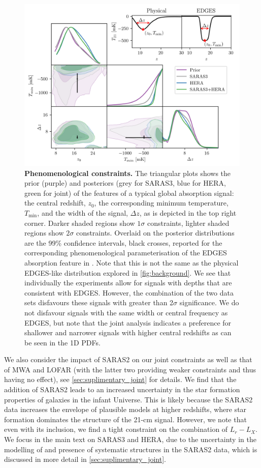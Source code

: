 \begin{figure}
    \centering
    \includegraphics{joint_constraints/figs/amp_width_cz.png}
    \caption{\textbf{Phenomenological constraints.} The triangular plots shows the prior (purple) and posteriors (grey for SARAS3, blue for HERA, green for joint) of the features of a typical global absorption signal: the central redshift, $z_0$, the corresponding minimum temperature, $T_\mathrm{min}$, and the width of the signal, $\Delta z$, as is depicted in the top right corner. Darker shaded regions show $1\sigma$ constraints, lighter shaded regions show $2\sigma$ constraints. Overlaid on the posterior distributions are the 99\% confidence intervals, black crosses, reported for the corresponding phenomenological parameterisation of the EDGES absorption feature in \cite{Bowman_edges_2018}. Note that this is not the same as the physical EDGES-like distribution explored in \cref{fig:background}.
    We see that individually the experiments allow for  signals with depths that are consistent with EDGES. However, the combination of the two data sets disfavours these signals with greater than 2$\sigma$ significance. We do not disfavour signals with the same width or central frequency as EDGES, but note that the joint analysis indicates a preference for shallower and narrower signals with higher central redshifts as can be seen in the 1D PDFs.}
    \label{fig:tmin}
\end{figure}

We also consider the impact of SARAS2 on our joint constraints as well as that of MWA and LOFAR (with the latter two providing weaker constraints and thus having no effect), see \cref{sec:suplimentary_joint} for details.  We find that the addition of SARAS2 leads to an increased uncertainty in the star formation properties of galaxies in the infant Universe. This is likely because the SARAS2 data increases the envelope of plausible models at higher redshifts, where star formation dominates the structure of the 21-cm signal.
However, we note that even with its inclusion, we find a tight constraint on the combination of $L_r - L_X$. We focus in the main text on SARAS3 and HERA, due to the uncertainty in the modelling of and presence of systematic structures in the SARAS2 data, which is discussed in more detail in \cref{sec:suplimentary_joint}.

